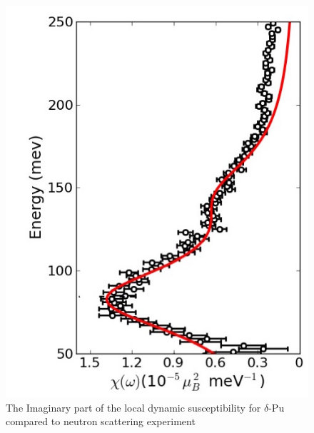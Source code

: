 \documentclass[10pt]{ruthesis}
\begin{document}
{\begin{figure}[H]
\begin{center}
\includegraphics[scale=0.5]{Susc_pu_cropped.jpg}
\caption{ The Imaginary part of the local dynamic susceptibility for $\delta$-Pu compared to neutron scattering experiment \cite{Me_Pu} }
\label{Susc_Pu}
\end{center}
\end{figure}

}
\end{document}
